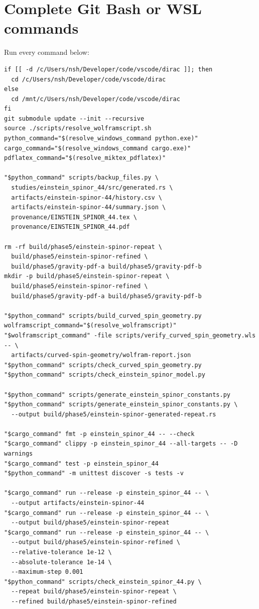 \documentclass[11pt]{article}
\begin{document}
\section{Complete Git Bash or WSL commands}

Run every command below:

\begin{Verbatim}[fontsize=\small]
if [[ -d /c/Users/nsh/Developer/code/vscode/dirac ]]; then
  cd /c/Users/nsh/Developer/code/vscode/dirac
else
  cd /mnt/c/Users/nsh/Developer/code/vscode/dirac
fi
git submodule update --init --recursive
source ./scripts/resolve_wolframscript.sh
python_command="$(resolve_windows_command python.exe)"
cargo_command="$(resolve_windows_command cargo.exe)"
pdflatex_command="$(resolve_miktex_pdflatex)"

"$python_command" scripts/backup_files.py \
  studies/einstein_spinor_44/src/generated.rs \
  artifacts/einstein-spinor-44/history.csv \
  artifacts/einstein-spinor-44/summary.json \
  provenance/EINSTEIN_SPINOR_44.tex \
  provenance/EINSTEIN_SPINOR_44.pdf

rm -rf build/phase5/einstein-spinor-repeat \
  build/phase5/einstein-spinor-refined \
  build/phase5/gravity-pdf-a build/phase5/gravity-pdf-b
mkdir -p build/phase5/einstein-spinor-repeat \
  build/phase5/einstein-spinor-refined \
  build/phase5/gravity-pdf-a build/phase5/gravity-pdf-b

"$python_command" scripts/build_curved_spin_geometry.py
wolframscript_command="$(resolve_wolframscript)"
"$wolframscript_command" -file scripts/verify_curved_spin_geometry.wls -- \
  artifacts/curved-spin-geometry/wolfram-report.json
"$python_command" scripts/check_curved_spin_geometry.py
"$python_command" scripts/check_einstein_spinor_model.py

"$python_command" scripts/generate_einstein_spinor_constants.py
"$python_command" scripts/generate_einstein_spinor_constants.py \
  --output build/phase5/einstein-spinor-generated-repeat.rs

"$cargo_command" fmt -p einstein_spinor_44 -- --check
"$cargo_command" clippy -p einstein_spinor_44 --all-targets -- -D warnings
"$cargo_command" test -p einstein_spinor_44
"$python_command" -m unittest discover -s tests -v

"$cargo_command" run --release -p einstein_spinor_44 -- \
  --output artifacts/einstein-spinor-44
"$cargo_command" run --release -p einstein_spinor_44 -- \
  --output build/phase5/einstein-spinor-repeat
"$cargo_command" run --release -p einstein_spinor_44 -- \
  --output build/phase5/einstein-spinor-refined \
  --relative-tolerance 1e-12 \
  --absolute-tolerance 1e-14 \
  --maximum-step 0.001
"$python_command" scripts/check_einstein_spinor_44.py \
  --repeat build/phase5/einstein-spinor-repeat \
  --refined build/phase5/einstein-spinor-refined


\end{Verbatim}
\end{document}

